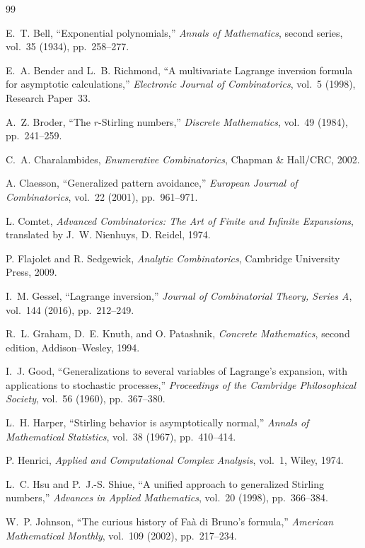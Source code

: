 \documentclass[11pt,a4paper,oneside,openany]{book}
\theoremstyle{definition}
\theoremstyle{remark}
\begin{document}
\begin{thebibliography}{99}

E.~T. Bell,
``Exponential polynomials,''
\emph{Annals of Mathematics}, second series, vol.~35 (1934), pp.~258--277.

E.~A. Bender and L.~B. Richmond,
``A multivariate Lagrange inversion formula for asymptotic calculations,''
\emph{Electronic Journal of Combinatorics}, vol.~5 (1998), Research Paper~33.

A.~Z. Broder,
``The $r$-Stirling numbers,''
\emph{Discrete Mathematics}, vol.~49 (1984), pp.~241--259.

C.~A. Charalambides,
\emph{Enumerative Combinatorics},
Chapman \& Hall/CRC, 2002.

A. Claesson,
``Generalized pattern avoidance,''
\emph{European Journal of Combinatorics}, vol.~22 (2001), pp.~961--971.

L. Comtet,
\emph{Advanced Combinatorics: The Art of Finite and Infinite Expansions},
translated by J.~W. Nienhuys, D. Reidel, 1974.

P. Flajolet and R. Sedgewick,
\emph{Analytic Combinatorics},
Cambridge University Press, 2009.

I.~M. Gessel,
``Lagrange inversion,''
\emph{Journal of Combinatorial Theory, Series A}, vol.~144 (2016),
pp.~212--249.

R.~L. Graham, D.~E. Knuth, and O. Patashnik,
\emph{Concrete Mathematics}, second edition,
Addison--Wesley, 1994.

I.~J. Good,
``Generalizations to several variables of Lagrange's expansion, with applications
to stochastic processes,''
\emph{Proceedings of the Cambridge Philosophical Society}, vol.~56 (1960),
pp.~367--380.

L.~H. Harper,
``Stirling behavior is asymptotically normal,''
\emph{Annals of Mathematical Statistics}, vol.~38 (1967), pp.~410--414.

P. Henrici,
\emph{Applied and Computational Complex Analysis}, vol.~1,
Wiley, 1974.

L.~C. Hsu and P.~J.-S. Shiue,
``A unified approach to generalized Stirling numbers,''
\emph{Advances in Applied Mathematics}, vol.~20 (1998), pp.~366--384.

W.~P. Johnson,
``The curious history of Fa\`a di Bruno's formula,''
\emph{American Mathematical Monthly}, vol.~109 (2002), pp.~217--234.


\end{thebibliography}
\end{document}
